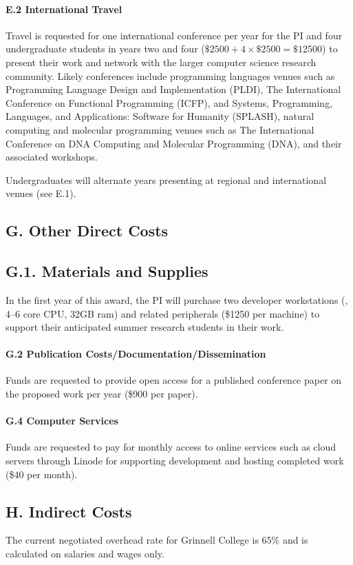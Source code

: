 \documentclass[11pt]{article}
\begin{document}
\paragraph{E.2 International Travel}
Travel is requested for one international conference per year for the PI and four undergraduate students in years two and four (\( \$2500 + 4 × \$2500 = \$12500 \)) to present their work and network with the larger computer science research community.
Likely conferences include programming languages venues such as Programming Language Design and Implementation (PLDI), The International Conference on Functional Programming (ICFP), and Systems, Programming, Languages, and Applications: Software for Humanity (SPLASH), natural computing and molecular programming venues such as The International Conference on DNA Computing and Molecular Programming (DNA), and their associated workshops.

Undergraduates will alternate years presenting at regional and international venues (see E.1).

\subsection*{G. Other Direct Costs}

\subsection*{G.1. Materials and Supplies}
In the first year of this award, the PI will purchase two developer workstations (\eg, 4--6 core CPU, 32GB ram) and related peripherals (\$1250 per machine) to support their anticipated summer research students in their work.

\paragraph{G.2 Publication Costs/Documentation/Dissemination}
Funds are requested to provide open access for a published conference paper on the proposed work per year (\$900 per paper).

\paragraph{G.4 Computer Services}
Funds are requested to pay for monthly access to online services such as cloud servers through Linode for supporting development and hosting completed work (\$40 per month).

\subsection*{H. Indirect Costs}
The current negotiated overhead rate for Grinnell College is 65\% and is calculated on salaries and wages only.
\end{document}
